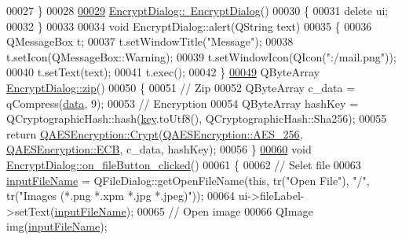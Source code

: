 \begin{DoxyCode}
00027 \}
00028 
\mbox{\hyperlink{class_encrypt_dialog_a466e283080f87ee50f172052e43e38b6}{00029}} \mbox{\hyperlink{class_encrypt_dialog_a466e283080f87ee50f172052e43e38b6}{EncryptDialog::~EncryptDialog}}()
00030 \{
00031     \textcolor{keyword}{delete} ui;
00032 \}
00033 
00034 \textcolor{keywordtype}{void} EncryptDialog::alert(QString text)
00035 \{
00036     QMessageBox t;
00037     t.setWindowTitle(\textcolor{stringliteral}{"Message"});
00038     t.setIcon(QMessageBox::Warning);
00039     t.setWindowIcon(QIcon(\textcolor{stringliteral}{":/mail.png"}));
00040     t.setText(text);
00041     t.exec();
00042 \}
\mbox{\hyperlink{class_encrypt_dialog_a2bff820a3df4ddc36ecb07ed74b7138a}{00049}} QByteArray \mbox{\hyperlink{class_encrypt_dialog_a2bff820a3df4ddc36ecb07ed74b7138a}{EncryptDialog::zip}}()
00050 \{
00051     \textcolor{comment}{// Zip}
00052     QByteArray c\_data = qCompress(\mbox{\hyperlink{class_encrypt_dialog_acf3a8bbce90d99ef17fec093c35b1008}{data}}, 9);
00053     \textcolor{comment}{// Encryption}
00054     QByteArray hashKey = QCryptographicHash::hash(\mbox{\hyperlink{class_encrypt_dialog_a1afdef3c665fb0d0fae06d1df8e84951}{key}}.toUtf8(), QCryptographicHash::Sha256);
00055     \textcolor{keywordflow}{return} \mbox{\hyperlink{class_q_a_e_s_encryption_a43819eeb6a7cb29fbd3cb6ad640dcbdf}{QAESEncryption::Crypt}}(\mbox{\hyperlink{class_q_a_e_s_encryption_abe48208f4f6c7d68e6a10b49b9d0b7bdacde97774ab1d4c609e04b0dd13a1e1f7}{QAESEncryption::AES\_256}}, 
      \mbox{\hyperlink{class_q_a_e_s_encryption_ad3e031c49a3d56566379d75b40b7b255a4ca7f51778e2adf1f464164a0ba8e75e}{QAESEncryption::ECB}}, c\_data, hashKey);
00056 \}
\mbox{\hyperlink{class_encrypt_dialog_ac9817d3f11f44f4bb8d97a228fbdf8a5}{00060}} \textcolor{keywordtype}{void} \mbox{\hyperlink{class_encrypt_dialog_ac9817d3f11f44f4bb8d97a228fbdf8a5}{EncryptDialog::on\_fileButton\_clicked}}()
00061 \{
00062     \textcolor{comment}{// Selet file}
00063     \mbox{\hyperlink{class_encrypt_dialog_a859b1bc2f032a247632b879bf8663d0b}{inputFileName}} = QFileDialog::getOpenFileName(\textcolor{keyword}{this}, tr(\textcolor{stringliteral}{"Open File"}), \textcolor{stringliteral}{"/"}, tr(\textcolor{stringliteral}{"Images (*.png
       *.xpm *.jpg *.jpeg)"}));
00064     ui->fileLabel->setText(\mbox{\hyperlink{class_encrypt_dialog_a859b1bc2f032a247632b879bf8663d0b}{inputFileName}});
00065     \textcolor{comment}{// Open image}
00066     QImage img(\mbox{\hyperlink{class_encrypt_dialog_a859b1bc2f032a247632b879bf8663d0b}{inputFileName}});

\end{DoxyCode}
